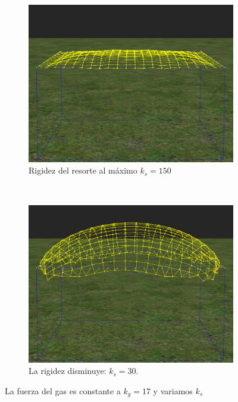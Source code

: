 \begin{figure}
 \centering
  \begin{subfigure}[b]{0.45\textwidth}
    \includegraphics[width=\textwidth]{Img/04/maxRes1}
    \caption{Rigidez del resorte al máximo $k_s=150$}
    \label{fig:maxRes1}
  \end{subfigure}
~
  \begin{subfigure}[b]{0.45\textwidth}
    \includegraphics[width=\textwidth]{Img/04/maxRes2}
    \caption{La rigidez disminuye: $k_s=30$.}
    \label{fig:maxRes2}
  \end{subfigure}
 \caption[Experimento: Fuerza del resorte]{La fuerza del gas es constante a $k_g=17$ y variamos $k_s$} 
 \label{fig:maxRes}
\end{figure}

